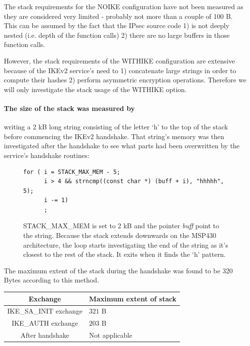 \documentclass[final,a4paper,twoside,11pt,onecolumn]{report}
\begin{document}
The stack requirements for the NOIKE configuration have not been measured as they are considered very limited - probably not more than a couple of 100 B. This can be assumed by the fact that the IPsec source code 1) is not deeply nested (i.e. depth of the function calls) 2) there are no large buffers in those function calls. 


However, the stack requirements of the WITHIKE configuration are extensive because of the IKEv2 service's need to 1) concatenate large strings in order to compute their hashes 2) perform asymmetric encryption operations. Therefore we will only investigate the stack usage of the WITHIKE option.

\paragraph{The size of the stack was measured by} writing a 2 kB long string consisting of the letter `h' to the top of the stack before commencing the IKEv2 handshake. That string's memory was then investigated after the handshake to see what parts had been overwritten by the service's handshake routines:

\begin{figure}
\centering
\begin{verbatim}
for ( i = STACK_MAX_MEM - 5;
      i > 4 && strncmp((const char *) (buff + i), "hhhhh", 5);
      i -= 1)
      ;
\end{verbatim}
\label{code:stack}
\caption{STACK\_MAX\_MEM is set to 2 kB and the pointer \emph{buff} point to the string. Because the stack extends downwards on the MSP430 architecture, the loop starts investigating the end of the string as it's closest to the rest of the stack. It exits when it finds the `h' pattern.}
\end{figure}

The maximum extent of the stack during the handshake was found to be 320 Bytes according to this method.

\begin{tabular}{c|l}
Exchange                      & Maximum extent of stack  \\ \hline
IKE\_SA\_INIT exchange      & $321$ B                    \\
IKE\_AUTH exchange          & $203$ B                    \\
   After handshake            & Not applicable
\end{tabular}
\end{document}
